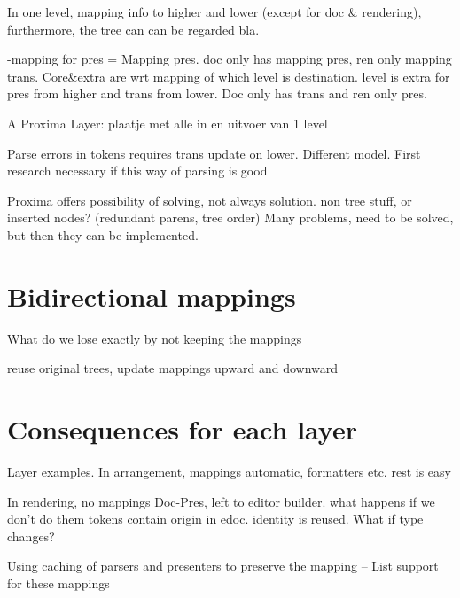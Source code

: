 In one level,  mapping info to higher and lower (except for doc \& rendering), furthermore, the tree can can be regarded bla.

-mapping for pres = Mapping pres. doc only has mapping pres, ren only mapping trans. Core\&extra are wrt mapping of which level is destination. level is extra for pres from higher and trans from lower. Doc only has trans  and ren only pres.



A Proxima Layer:
plaatje met alle in en uitvoer van 1 level


Parse errors in tokens requires trans update on lower. Different model. First research necessary if this way of parsing is good

Proxima offers possibility of solving, not always solution. non tree stuff, or inserted nodes? (redundant parens, tree order) Many problems, need to be solved, but then they can be implemented.






\section{Bidirectional mappings}

What do we lose exactly by not keeping the mappings

reuse original trees, update mappings upward and downward

\section{Consequences for each layer}
Layer examples.
In arrangement, mappings automatic, formatters etc. rest is easy

In rendering, no mappings
Doc-Pres, left to editor builder. what happens if we don't do them
tokens contain origin in edoc. identity is reused. What if type changes?


Using caching of parsers and presenters to preserve the mapping
-- List support for these mappings